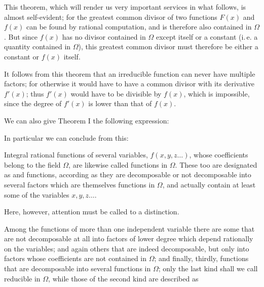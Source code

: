 
This theorem, which will render us very important services in what follows, is almost self-evident; for the greatest common divisor of two functions $F(x)$ and $f(x)$ can be found by rational computation, and is therefore also contained in $\Omega$. But since $f(x)$ has no divisor contained in $\Omega$ except itself or a constant (i.\,e. a quantity contained in $\Omega$), this greatest common divisor must therefore be either a constant or $f(x)$ itself.

It follows from this theorem that an irreducible function can never have multiple factors; for otherwise it would have to have a common divisor with its derivative $f'(x)$; thus $f'(x)$ would have to be divisible by $f(x)$, which is impossible, since the degree of $f'(x)$ is lower than that of $f(x)$.

We can also give Theorem I the following expression:


In particular we can conclude from this:


Integral rational functions of several variables, $f(x, y, z \ldots)$, whose coefficients belong to the field $\Omega$, are likewise called functions in $\Omega$. These too are designated as  and  functions, according as they are decomposable or not decomposable into several factors which are themselves functions in $\Omega$, and actually contain at least some of the variables $x, y, z \ldots$.

Here, however, attention must be called to a distinction.

Among the functions of more than one independent variable there are some that are not decomposable at all into factors of lower degree which depend rationally on the variables; and again others that are indeed decomposable, but only into factors whose coefficients are not contained in $\Omega$; and finally, thirdly, functions that are decomposable into several functions in $\Omega$; only the last kind shall we call reducible in $\Omega$, while those of the second kind are described as 
